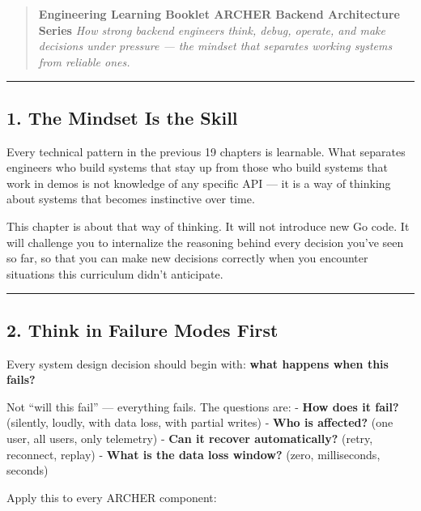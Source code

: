 \documentclass[
]{article}
\begin{document}
\begin{quote}
\textbf{Engineering Learning Booklet \textbar{} ARCHER Backend
Architecture Series} \emph{How strong backend engineers think, debug,
operate, and make decisions under pressure --- the mindset that
separates working systems from reliable ones.}
\end{quote}

\begin{center}\rule{0.5\linewidth}{0.5pt}\end{center}

\hypertarget{the-mindset-is-the-skill}{%
\subsection{1. The Mindset Is the
Skill}\label{the-mindset-is-the-skill}}

Every technical pattern in the previous 19 chapters is learnable. What
separates engineers who build systems that stay up from those who build
systems that work in demos is not knowledge of any specific API --- it
is a way of thinking about systems that becomes instinctive over time.

This chapter is about that way of thinking. It will not introduce new Go
code. It will challenge you to internalize the reasoning behind every
decision you've seen so far, so that you can make new decisions
correctly when you encounter situations this curriculum didn't
anticipate.

\begin{center}\rule{0.5\linewidth}{0.5pt}\end{center}

\hypertarget{think-in-failure-modes-first}{%
\subsection{2. Think in Failure Modes
First}\label{think-in-failure-modes-first}}

Every system design decision should begin with: \textbf{what happens
when this fails?}

Not ``will this fail'' --- everything fails. The questions are: -
\textbf{How does it fail?} (silently, loudly, with data loss, with
partial writes) - \textbf{Who is affected?} (one user, all users, only
telemetry) - \textbf{Can it recover automatically?} (retry, reconnect,
replay) - \textbf{What is the data loss window?} (zero, milliseconds,
seconds)

Apply this to every ARCHER component:
\end{document}
